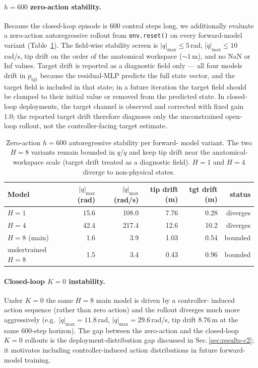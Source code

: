 \documentclass[sn-mathphys,NameDate,iicol]{sn-jnl}
\begin{document}
\begin{appendices}
\paragraph{$h{=}600$ zero-action stability.}
Because the closed-loop episode is $600$ control steps long, we
additionally evaluate a zero-action autoregressive rollout from
\texttt{env.reset()} on every forward-model variant
(Table~\ref{tab:fwd_h600_stability}). The field-wise stability screen is
$|q|_{\max}\!\leq\!5$\,rad,
$|\dot q|_{\max}\!\leq\!10$\,rad/s,
tip drift on the order of the anatomical workspace ($\sim\!1$\,m),
and no NaN or Inf values.
Target drift is reported as a diagnostic field only --- all four
models drift in $p_{\mathrm{tgt}}$ because the residual-MLP predicts
the full state vector, and the target field is included in that
state; in a future iteration the target field should be clamped to
their initial value or removed from the predicted state.
In closed-loop deployments, the target channel is observed and corrected
with fixed gain $1.0$; the reported target drift therefore diagnoses only
the unconstrained open-loop rollout, not the controller-facing target
estimate.

\begin{table}[!htbp]
\centering
\caption{Zero-action $h{=}600$ autoregressive stability per forward-%
model variant. The two $H{=}8$ variants remain bounded in
$q$/$\dot q$ and keep tip drift near the anatomical-workspace scale
(target drift treated as a diagnostic field). $H{=}1$ and $H{=}4$
diverge to non-physical states.}
\label{tab:fwd_h600_stability}
\setlength{\tabcolsep}{4pt}
\footnotesize
\begin{tabular}{@{}l rrrrr@{}}
\toprule
Model & $|q|_{\max}$ (rad) & $|\dot q|_{\max}$ (rad/s) & tip drift (m) & tgt drift (m) & status \\
\midrule
$H{=}1$ & 15.6 & 108.0 & 7.76 & 0.28 & diverges \\
$H{=}4$ & 42.4 & 217.4 & 12.6 & 10.2 & diverges \\
$H{=}8$ (main) & 1.6 & 3.9 & 1.03 & 0.54 & bounded \\
undertrained $H{=}8$ & 1.5 & 3.4 & 0.43 & 0.96 & bounded \\
\bottomrule
\end{tabular}
\end{table}

\paragraph{Closed-loop $K{=}0$ instability.}
Under $K{=}0$ the same $H{=}8$ main model is driven by a controller-%
induced action sequence (rather than zero action) and the rollout
diverges much more aggressively (e.g.\ $|q|_{\max}{=}11.8$\,rad,
$|\dot q|_{\max}{=}29.6$\,rad/s, tip drift $8.76$\,m at the same
$600$-step horizon). The gap between the zero-action and the
closed-loop $K{=}0$ rollouts is the deployment-distribution gap
discussed in Sec.\,\ref{sec:results-c2}; it motivates including
controller-induced action distributions in future forward-model
training.


\end{appendices}
\end{document}
